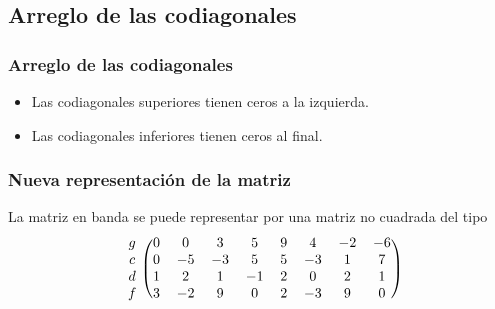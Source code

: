\subsection{Arreglo de las codiagonales}
\begin{frame}
\frametitle{Arreglo de las codiagonales}
\begin{figure}
    \centering
        
\end{figure}
\begin{itemize}
\item Las codiagonales superiores tienen ceros a la izquierda.
\item Las codiagonales inferiores tienen ceros al final.
\end{itemize}
\end{frame}
\begin{frame}
\frametitle{Nueva representación de la matriz}
La matriz en banda se puede representar por una matriz no cuadrada del tipo
\\
\bigskip
\pause
\[
\begin{blockarray}{ccccccccc}
\begin{block}{c(cccccccc)}
g & 0 & 0 & 3 & 5 & 9 & 4 & -2 & -6 \\
c & 0 & -5 & -3 & 5 & 5 & -3 & 1 & 7 \\
d & 1 & 2 & 1 & -1 & 2 & 0 & 2 & 1 \\
f & 3 & -2 & 9 & 0 & 2 & -3 & 9 & 0 \\
\end{block}
\end{blockarray}
 \]
\end{frame}
